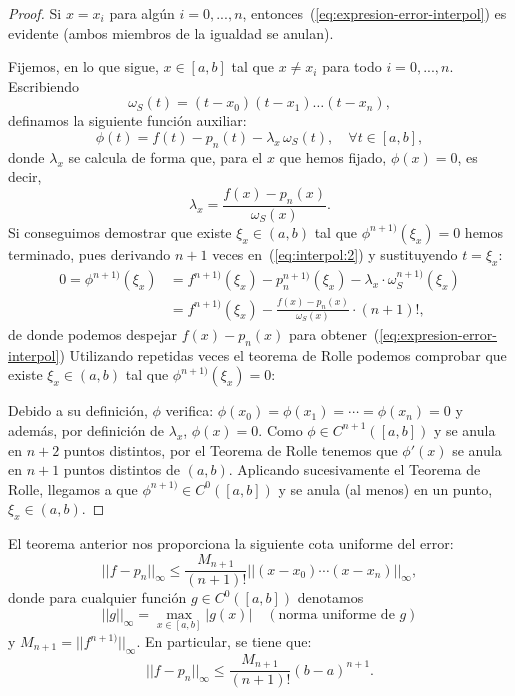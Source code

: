 \begin{proof}
  Si $x=x_i$ para algún $i=0,...,n$,
  entonces~(\ref{eq:expresion-error-interpol}) es evidente (ambos
  miembros de la igualdad se anulan).

   Fijemos, en lo que sigue, $x\in[a,b]$ tal que
  $x\neq x_i$ para todo $i=0,...,n$. Escribiendo
  \begin{equation}
    \omega_S(t)=(t-x_0)(t-x_1)\dots (t-x_n),
    \label{eq:w_S:3}
  \end{equation}
  definamos la siguiente función auxiliar:
  \begin{equation}
    \phi(t)=f(t)-p_n(t)-\lambda_x\, \omega_S(t), \quad \forall t\in[a,b],
    \label{eq:interpol:2}
  \end{equation}
  donde $\lambda_x$ se calcula de forma que, para el $x$ que hemos
  fijado, $\phi(x)=0$, es decir,
  $$
  \lambda_x = \frac{f(x)-p_n(x)}{\omega_S(x)}.
  $$
  Si conseguimos demostrar que existe $\xi_x\in (a,b)$ tal que
  $\phi^{n+1)}(\xi_x)=0$ hemos terminado, pues derivando $n+1$ veces
  en~(\ref{eq:interpol:2}) y sustituyendo $t=\xi_x$:
  \begin{align*}
    0=\phi^{n+1)}(\xi_x)&=f^{n+1)}(\xi_x)-p_n^{n+1)}(\xi_x)-\lambda_x\cdot\omega_S^{n+1)}(\xi_x)
    \\
                        &=f^{n+1)}(\xi_x)- \frac{f(x)-p_n(x)}{\omega_S(x)}\cdot (n+1)!,
  \end{align*}
  de donde podemos despejar $f(x)-p_n(x)$ para
  obtener~(\ref{eq:expresion-error-interpol}) 
  Utilizando repetidas veces el teorema de Rolle podemos comprobar que
  existe $\xi_x\in (a,b)$ tal que $\phi^{n+1)}(\xi_x)=0$:

  Debido a su definición, $\phi$ verifica:
  $\phi(x_0)=\phi(x_1)=\cdots=\phi(x_n)=0$ y además, por definición de
  $\lambda_x$, $\phi(x)=0$. Como $\phi\in C^{n+1}([a,b])$ y se anula
  en $n+2$ puntos distintos, por el Teorema de Rolle tenemos que
  $\phi'(x)$ se anula en $n+1$ puntos distintos de $(a,b)$. Aplicando
  sucesivamente el Teorema de Rolle, llegamos a que $\phi^{n+1)}\in
  C^0([a,b])$ y se anula (al menos) en un punto, $\xi_x\in (a,b)$.
\end{proof}

\begin{remark}
  \label{rk:2}
  El teorema anterior nos proporciona la siguiente cota uniforme del
  error:
  \begin{equation}
    ||f-p_n||_{\infty} \le \frac{M_{n+1}}{(n+1)!}||(x-x_0)\cdots(x-x_n)||_\infty,
    \label{eq:cota-error-interpol-1}
  \end{equation}
  donde para cualquier función $g\in C^0([a,b])$ denotamos
  \begin{equation*}
    ||g||_\infty = \max_{x\in[a,b]} |g(x)|  \quad (\text{norma
      uniforme de $g$})
  \end{equation*}
  y $M_{n+1}=||f^{n+1)}||_\infty$.  En particular, se tiene que:
  \begin{equation*}
    ||f-p_n||_{\infty} \le \frac{M_{n+1}}{(n+1)!}(b-a)^{n+1}.
    \label{eq:cota-error-interpol-2}
  \end{equation*}
\end{remark}

